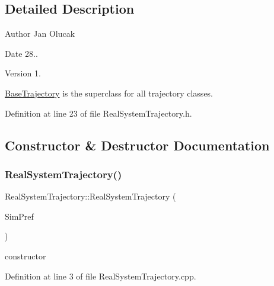 \subsection{Detailed Description}
\begin{DoxyAuthor}{Author}
Jan Olucak 
\end{DoxyAuthor}
\begin{DoxyDate}{Date}
28.. 
\end{DoxyDate}
\begin{DoxyVersion}{Version}
1.
\end{DoxyVersion}
\hyperlink{class_base_trajectory}{Base\+Trajectory} is the superclass for all trajectory classes. 

Definition at line 23 of file Real\+System\+Trajectory.\+h.



\subsection{Constructor \& Destructor Documentation}
\mbox{\label{class_real_system_trajectory_acfb42e8dbeadf71ce22d31ed51f0e6c0}} 
\subsubsection{\texorpdfstring{Real\+System\+Trajectory()}{RealSystemTrajectory()}}
{\footnotesize\ttfamily Real\+System\+Trajectory\+::\+Real\+System\+Trajectory (\begin{DoxyParamCaption}\item[{Sim\+D\+Preference \&}]{Sim\+Pref }\end{DoxyParamCaption})}



constructor 



Definition at line 3 of file Real\+System\+Trajectory.\+cpp.

\mbox{\label{class_real_system_trajectory_a6ae4a18127c674dd4926ecc7ff92487e}} 
